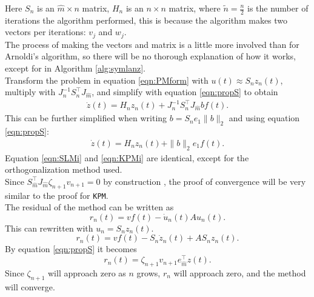 Here $S_n$ is an $\hat{m} \times n $ matrix, $H_n$ is an $ n \times n $ matrix, where $ \tilde{n} = \frac{n}{2}$ is the number of iterations the algorithm performed, this is because the algorithm makes two vectors per iterations: $v_j$ and $w_j$. \\

The process of making the vectors and matrix is a little more involved than for Arnoldi's algorithm, so there will be no thorough explanation of how it works, except for in Algorithm \ref{alg:symlanz}.\\

Transform the problem in equation \eqref{eqn:PMform} with $u(t) \approx S_n z_n(t)$, multiply with $J^{-1}_n S_n^\top J_{ \hat{m} }$, and simplify with equation \eqref{eqn:propS} to obtain
\begin{equation*}
\begin{aligned}
\dot{z}(t) = H_n z_n(t) + J_n^{-1} S_n^\top J_{\hat{m}} b f(t).
\end{aligned}
\end{equation*}
This can be further simplified when writing $ b = S_n e_1 \| b \|_2 $ and using equation \eqref{eqn:propS}:
\begin{equation}
\begin{aligned}
\dot{z}(t) = H_n z_n(t) + \|b \|_2 e_1 f(t).
\end{aligned}
\label{eqn:SLMi}
\end{equation}
Equation \eqref{eqn:SLMi} and \eqref{eqn:KPMi} are identical, except for the orthogonalization method used. \\

Since $ S_{\hat{m}}^\top J_{\hat{m}} \zeta_{n+1} v_{n+1} = 0 $ by construction \cite{SLMconv}, the proof of convergence will be very similar to the proof for \texttt{KPM}.\\
The residual of the method can be written as
\begin{equation*}
r_n(t) = v f(t) - \dot{u}_n(t) A u_n(t).
\end{equation*}
This can rewritten with $u_n = S_n z_n(t)$.
\begin{equation*}
r_n(t) = v f(t) -S_n \dot{z}_n(t) + A S_n z_n(t).
\end{equation*}
By equation \eqref{eqn:propS} it becomes
\begin{equation*}
r_n(t) =  \zeta_{n+1} v_{n+1} e_{\hat{m}}^\top z(t).
\end{equation*}
Since $\zeta_{n+1}$ will approach zero as $n$ grows, $r_n$ will approach zero, and the method will converge. \\

